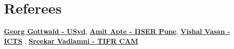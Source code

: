 \documentclass[a4paper, 11pt]{article}
\begin{document}
\section*{Referees}
\textbf{\href{https://www.maths.usyd.edu.au/u/gottwald/}{\color{linkblue}Georg Gottwald - USyd}},
\textbf{\href{https://www.iiserpune.ac.in/research/department/data-science/people/faculty/regular-faculty/amit-apte/359}{\color{linkblue}Amit Apte - IISER Pune}},
 \textbf{\href{https://www.icts.res.in/people/vishal-vasan}{\color{linkblue}Vishal Vasan - ICTS}} 
   ,  
 \textbf{\href{http://math.tifrbng.res.in/~sreekar/Site/Home.html}{\color{linkblue}Sreekar Vadlamni - TIFR CAM}}
 
\end{document}
